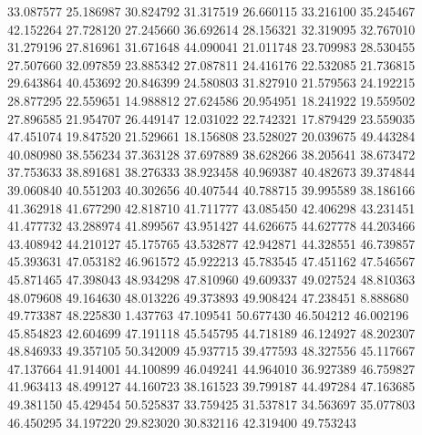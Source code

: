 33.087577
25.186987
30.824792
31.317519
26.660115
33.216100
35.245467
42.152264
27.728120
27.245660
36.692614
28.156321
32.319095
32.767010
31.279196
27.816961
31.671648
44.090041
21.011748
23.709983
28.530455
27.507660
32.097859
23.885342
27.087811
24.416176
22.532085
21.736815
29.643864
40.453692
20.846399
24.580803
31.827910
21.579563
24.192215
28.877295
22.559651
14.988812
27.624586
20.954951
18.241922
19.559502
27.896585
21.954707
26.449147
12.031022
22.742321
17.879429
23.559035
47.451074
19.847520
21.529661
18.156808
23.528027
20.039675
49.443284
40.080980
38.556234
37.363128
37.697889
38.628266
38.205641
38.673472
37.753633
38.891681
38.276333
38.923458
40.969387
40.482673
39.374844
39.060840
40.551203
40.302656
40.407544
40.788715
39.995589
38.186166
41.362918
41.677290
42.818710
41.711777
43.085450
42.406298
43.231451
41.477732
43.288974
41.899567
43.951427
44.626675
44.627778
44.203466
43.408942
44.210127
45.175765
43.532877
42.942871
44.328551
46.739857
45.393631
47.053182
46.961572
45.922213
45.783545
47.451162
47.546567
45.871465
47.398043
48.934298
47.810960
49.609337
49.027524
48.810363
48.079608
49.164630
48.013226
49.373893
49.908424
47.238451
8.888680
49.773387
48.225830
1.437763
47.109541
50.677430
46.504212
46.002196
45.854823
42.604699
47.191118
45.545795
44.718189
46.124927
48.202307
48.846933
49.357105
50.342009
45.937715
39.477593
48.327556
45.117667
47.137664
41.914001
44.100899
46.049241
44.964010
36.927389
46.759827
41.963413
48.499127
44.160723
38.161523
39.799187
44.497284
47.163685
49.381150
45.429454
50.525837
33.759425
31.537817
34.563697
35.077803
46.450295
34.197220
29.823020
30.832116
42.319400
49.753243
